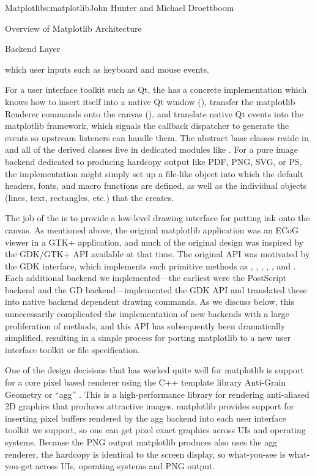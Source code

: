 \begin{aosachapter}{Matplotlib}{s:matplotlib}{John Hunter and Michael Droettboom}
\begin{aosasect1}{Overview of Matplotlib Architecture}
\begin{aosasect2}{Backend Layer}
\begin{aosaitemize}
\item {} which user inputs such as keyboard and mouse events.
\end{aosaitemize}

For a user interface toolkit such as Qt, the  has a
concrete implementation which knows how to insert itself into a native
Qt window (), transfer the matplotlib Renderer
commands onto the canvas (), and translate native
Qt events into the matplotlib  framework, which signals the
callback dispatcher to generate the events so upstream listeners can
handle them.  The abstract base classes reside in
 and all of the derived classes live
in dedicated modules like .
For a pure image backend dedicated to producing hardcopy output like
PDF, PNG, SVG, or PS, the  implementation might
simply set up a file-like object into which the default headers,
fonts, and macro functions are defined, as well as the individual
objects (lines, text, rectangles, etc.) that the  creates.

The job of the  is to provide a low-level drawing
interface for putting ink onto the canvas.  As mentioned above, the
original matplotlib application was an ECoG viewer in a GTK+
application, and much of the original design was inspired by the
GDK/GTK+ API available at that time.  The original  API
was motivated by the GDK  interface, which implements
such primitive methods as , ,
, , , and
.  Each additional backend we implemented---the
earliest were the PostScript backend and the GD backend---implemented
the GDK  API and translated these into native backend
dependent drawing commands.  As we discuss below, this unnecessarily
complicated the implementation of new backends with a large
proliferation of methods, and this API has subsequently been
dramatically simplified, resulting in a simple process for porting
matplotlib to a new user interface toolkit or file specification.

One of the design decisions that has worked quite well for matplotlib
is support for a core pixel based renderer using the C++ template
library Anti-Grain Geometry or ``agg'' \cite{bib:agg}.  This is a
high-performance library for rendering anti-aliased 2D graphics that
produces attractive images.  matplotlib provides support for inserting
pixel buffers rendered by the agg backend into each user interface
toolkit we support, so one can get pixel exact graphics across UIs and
operating systems.  Because the PNG output matplotlib produces also
uses the agg renderer, the hardcopy is identical to the screen
display, so what-you-see is what-you-get across UIs, operating systems
and PNG output.


\end{aosasect2}
\end{aosasect1}
\end{aosachapter}
